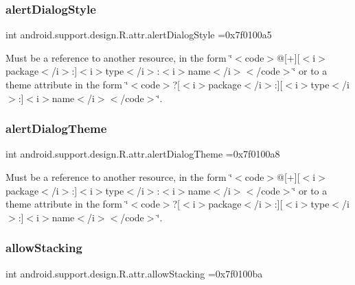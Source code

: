 \subsubsection{\texorpdfstring{alert\+Dialog\+Style}{alertDialogStyle}}
{\footnotesize\ttfamily int android.\+support.\+design.\+R.\+attr.\+alert\+Dialog\+Style =0x7f0100a5\hspace{0.3cm}{\ttfamily [static]}}

Must be a reference to another resource, in the form \char`\"{}$<$code$>$@\mbox{[}+\mbox{]}\mbox{[}$<$i$>$package$<$/i$>$\+:\mbox{]}$<$i$>$type$<$/i$>$\+:$<$i$>$name$<$/i$>$$<$/code$>$\char`\"{} or to a theme attribute in the form \char`\"{}$<$code$>$?\mbox{[}$<$i$>$package$<$/i$>$\+:\mbox{]}\mbox{[}$<$i$>$type$<$/i$>$\+:\mbox{]}$<$i$>$name$<$/i$>$$<$/code$>$\char`\"{}. \mbox{\label{classandroid_1_1support_1_1design_1_1R_1_1attr_a7654c30f567e69029288754a31b69125}} 
\subsubsection{\texorpdfstring{alert\+Dialog\+Theme}{alertDialogTheme}}
{\footnotesize\ttfamily int android.\+support.\+design.\+R.\+attr.\+alert\+Dialog\+Theme =0x7f0100a8\hspace{0.3cm}{\ttfamily [static]}}

Must be a reference to another resource, in the form \char`\"{}$<$code$>$@\mbox{[}+\mbox{]}\mbox{[}$<$i$>$package$<$/i$>$\+:\mbox{]}$<$i$>$type$<$/i$>$\+:$<$i$>$name$<$/i$>$$<$/code$>$\char`\"{} or to a theme attribute in the form \char`\"{}$<$code$>$?\mbox{[}$<$i$>$package$<$/i$>$\+:\mbox{]}\mbox{[}$<$i$>$type$<$/i$>$\+:\mbox{]}$<$i$>$name$<$/i$>$$<$/code$>$\char`\"{}. \mbox{\label{classandroid_1_1support_1_1design_1_1R_1_1attr_a12ec14191d9a3072180ffdf038577cae}} 
\subsubsection{\texorpdfstring{allow\+Stacking}{allowStacking}}
{\footnotesize\ttfamily int android.\+support.\+design.\+R.\+attr.\+allow\+Stacking =0x7f0100ba\hspace{0.3cm}{\ttfamily [static]}}

